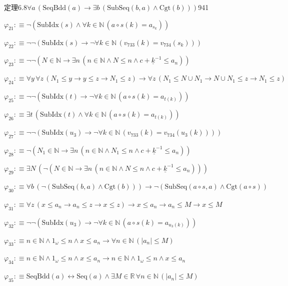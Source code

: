 \begin{fullproof}{定理6.8}{$\forall a\,(\mathrm{SeqBdd}(a) \to \exists b\,(\mathrm{SubSeq}(b,a) \land \mathrm{Cgt}(b)))$}{941}
\begin{abbrevlist}
\item $\varphi_{21} :\equiv \neg (\mathrm{SubIdx}(s) \land \forall k \in \mathbb{N}\,(a \circ s(k) = a_{s_{k}}))$
\item $\varphi_{22} :\equiv \neg \neg (\mathrm{SubIdx}(s) \to \neg \forall k \in \mathbb{N}\,(v_{733}(k) = v_{734}(s_{k})))$
\item $\varphi_{23} :\equiv \neg \neg (N \in \mathbb{N} \to \exists n\,(n \in \mathbb{N} \land N \leq n \land c + \underline{k}^{-1} \leq a_{n}))$
\item $\varphi_{24} :\equiv \forall y\,\forall z\,(N_{1} \leq y \to y \leq z \to N_{1} \leq z) \to \forall z\,(N_{1} \leq N \cup N_{1} \to N \cup N_{1} \leq z \to N_{1} \leq z)$
\item $\varphi_{25} :\equiv \neg \neg (\mathrm{SubIdx}(t) \to \neg \forall k \in \mathbb{N}\,(a \circ s(k) = a_{t(k)}))$
\item $\varphi_{26} :\equiv \exists t\,(\mathrm{SubIdx}(t) \land \forall k \in \mathbb{N}\,(a \circ s(k) = a_{t(k)}))$
\item $\varphi_{27} :\equiv \neg \neg (\mathrm{SubIdx}(u_{3}) \to \neg \forall k \in \mathbb{N}\,(v_{733}(k) = v_{734}(u_{3}(k))))$
\item $\varphi_{28} :\equiv \neg (N_{1} \in \mathbb{N} \to \exists n\,(n \in \mathbb{N} \land N_{1} \leq n \land c + \underline{k}^{-1} \leq a_{n}))$
\item $\varphi_{29} :\equiv \exists N\,(\neg (N \in \mathbb{N} \to \exists n\,(n \in \mathbb{N} \land N \leq n \land c + \underline{k}^{-1} \leq a_{n})))$
\item $\varphi_{30} :\equiv \forall b\,(\neg (\mathrm{SubSeq}(b,a) \land \mathrm{Cgt}(b))) \to \neg (\mathrm{SubSeq}(a \circ s,a) \land \mathrm{Cgt}(a \circ s))$
\item $\varphi_{31} :\equiv \forall z\,(x \leq a_{n} \to a_{n} \leq z \to x \leq z) \to x \leq a_{n} \to a_{n} \leq M \to x \leq M$
\item $\varphi_{32} :\equiv \neg \neg (\mathrm{SubIdx}(u_{3}) \to \neg \forall k \in \mathbb{N}\,(a \circ s(k) = a_{u_{3}(k)}))$
\item $\varphi_{33} :\equiv n \in \mathbb{N} \land 1_{\omega} \leq n \land x \leq a_{n} \to \forall n \in \mathbb{N}\,(\lvert a_{n} \rvert \leq M)$
\item $\varphi_{34} :\equiv n \in \mathbb{N} \land 1_{\omega} \leq n \land x \leq a_{n} \to n \in \mathbb{N} \land 1_{\omega} \leq n \land x \leq a_{n}$
\item $\varphi_{35} :\equiv \mathrm{SeqBdd}(a) \leftrightarrow \mathrm{Seq}(a) \land \exists M \in \mathbb{R}\,\forall n \in \mathbb{N}\,(\lvert a_{n} \rvert \leq M)$

\end{abbrevlist}
\end{fullproof}
